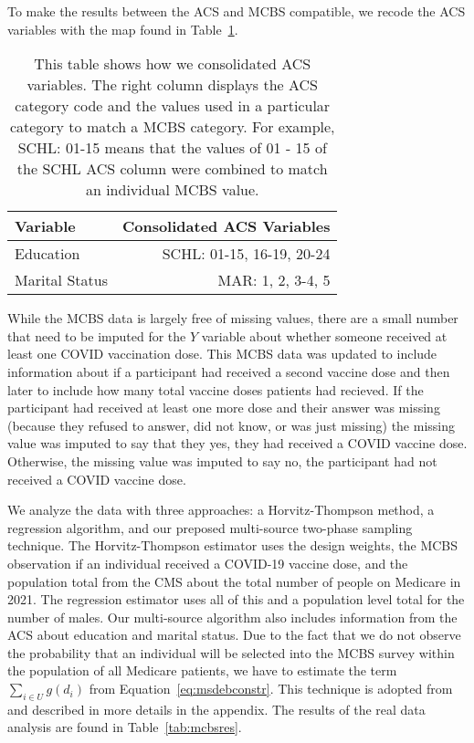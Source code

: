 \documentclass[12pt]{article}
\begin{document}
To make the results between the ACS and MCBS compatible, we recode the 
ACS variables with the map found in Table~\ref{tab:acsvars}.

\begin{table}[ht!]
  \centering
  \label{tab:acsvars}
  \begin{tabular}{lr}
  \toprule
  Variable & Consolidated ACS Variables \\
  \midrule
  Education & SCHL:  01-15, 16-19, 20-24 \\
  Marital Status & MAR: 1, 2, 3-4, 5 \\
  \bottomrule
  \end{tabular}
  \caption{This table shows how we consolidated ACS variables. The right column
  displays the ACS category code and the values used in a particular category to
  match a MCBS category. For example, SCHL: 01-15 means that the values of 01 -
  15 of the SCHL ACS column were combined to match an individual MCBS value.}
\end{table}

While the MCBS data is largely free of missing values, there are a small number
that need to be imputed for the $Y$ variable about whether someone received at
least one COVID vaccination dose. This MCBS data was updated to include
information about if a participant had received a second vaccine dose and then
later to include how many total vaccine doses patients had recieved. If the
participant had received at least one more dose and their answer was missing (because
they refused to answer, did not know, or was just missing) the missing value was
imputed to say that they yes, they had received a COVID vaccine dose. Otherwise,
the missing value was imputed to say no, the participant had not received a
COVID vaccine dose.

We analyze the data with three approaches: a Horvitz-Thompson method, a
regression algorithm, and our preposed multi-source two-phase sampling technique. 
The Horvitz-Thompson estimator uses the design weights, the MCBS observation if
an individual received a COVID-19 vaccine dose, and the population total from
the CMS about the total number of people on Medicare in 2021. The regression
estimator uses all of this and a population level total for the number of males.
Our multi-source algorithm also includes information from the ACS about
education and marital status. Due to the fact that we do not observe the
probability that an individual will be selected into the MCBS survey within the
population of all Medicare patients, we have to estimate the term 
$\sum_{i \in U} g(d_i)$ from Equation~\ref{eq:msdebconstr}. This technique is
adopted from \cite{kwon2024debiased} and described in more details in the
appendix.
The results of the real data analysis are found in Table~\ref{tab:mcbsres}.
\end{document}
